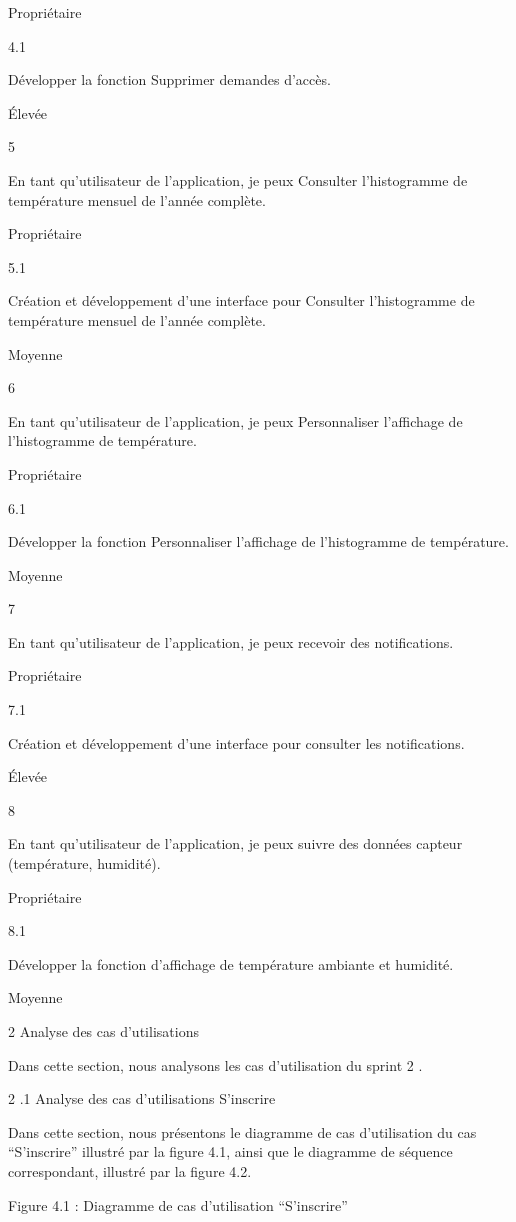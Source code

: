 \documentclass{article}
\begin{document}
Propriétaire

4.1

Développer la fonction Supprimer demandes d’accès.

Élevée

5

En tant qu’utilisateur de l’application, je peux Consulter l'histogramme de température mensuel de l'année complète.

Propriétaire

5.1

Création et développement d’une interface pour Consulter l'histogramme de température mensuel de l'année complète.

Moyenne

6

En tant qu’utilisateur de l’application, je peux Personnaliser l'affichage  de l'histogramme de température.

Propriétaire

6.1

Développer la fonction Personnaliser l'affichage de l'histogramme de température.

Moyenne

7

En tant qu’utilisateur de l’application, je peux recevoir des notifications.

Propriétaire

7.1

Création et développement d’une interface pour consulter les notifications.

Élevée

8

En tant qu’utilisateur de l’application, je peux suivre des données capteur (température, humidité).

Propriétaire

8.1

Développer la fonction d’affichage de température ambiante et humidité.

Moyenne

2 Analyse des cas d’utilisations 

Dans cette section, nous analysons les cas d’utilisation du sprint 2 .

2 .1 Analyse des cas d’utilisations S’inscrire

Dans cette section, nous présentons le diagramme de cas d'utilisation du cas “S’inscrire”  illustré par la figure 4.1, ainsi que le diagramme de séquence correspondant, illustré par la figure 4.2.

Figure 4.1 : Diagramme de cas d’utilisation “S’inscrire”
\end{document}
